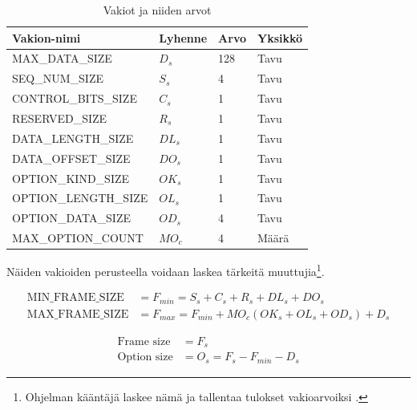 \documentclass[a4paper,12pt]{article}
\begin{document}
    \begin{table}[h!]
        \centering
        \begin{tabular}{llll}
            Vakion-nimi          & Lyhenne & Arvo & Yksikkö \\
            \hline
            MAX\_DATA\_SIZE      & $D_s$   & 128  & Tavu    \\
            SEQ\_NUM\_SIZE       & $S_s$   & 4    & Tavu    \\
            CONTROL\_BITS\_SIZE  & $C_s$   & 1    & Tavu    \\
            RESERVED\_SIZE       & $R_s$   & 1    & Tavu    \\
            DATA\_LENGTH\_SIZE   & $DL_s$  & 1    & Tavu    \\
            DATA\_OFFSET\_SIZE   & $DO_s$  & 1    & Tavu    \\
            OPTION\_KIND\_SIZE   & $OK_s$  & 1    & Tavu    \\
            OPTION\_LENGTH\_SIZE & $OL_s$  & 1    & Tavu    \\
            OPTION\_DATA\_SIZE   & $OD_s$  & 4    & Tavu    \\
            MAX\_OPTION\_COUNT   & $MO_c$  & 4    & Määrä
        \end{tabular}
        \caption{Vakiot ja niiden arvot}
        \label{tab:vakiot}
    \end{table}

    Näiden vakioiden perusteella voidaan laskea tärkeitä muuttujia\footnote{Ohjelman kääntäjä laskee nämä ja tallentaa tulokset vakioarvoiksi \cite{rust_book_constant_evaluation}.}.

    \begin{align}
        \text{MIN\_FRAME\_SIZE} &= F_{min} = S_s + C_s + R_s + DL_s + DO_s \\
        \text{MAX\_FRAME\_SIZE} &= F_{max} = F_{min} + MO_c(OK_s + OL_s + OD_s) + D_s \label{eq:fmax}
    \end{align}

    \begin{align}
        \text{Frame size} &= F_s \\
        \text{Option size} &= O_s = F_s - F_{min} - D_s
    \end{align}
\end{document}
